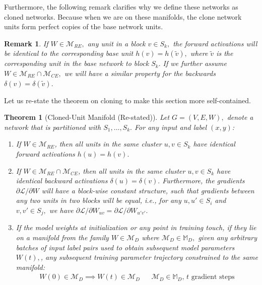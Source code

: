\documentclass{article}
\newcommand{\Loss}{\mathcal{L}}
\newcommand{\ManifoldD}{\mathcal{M}_{D}}
\newcommand{\ManifoldRE}{\mathcal{M}_{RE}}
\newcommand{\ManifoldCE}{\mathcal{M}_{CE}}
\newtheorem{theorem}{Theorem}[section]
\newtheorem{remark}{Remark}[section]
\numberwithin{figure}{section}
\begin{document}
Furthermore, the following remark clarifies why we define these networks as cloned networks. Because when we are on these manifolds, the clone network units form perfect copies of the base network units. 
\begin{remark}
    If $W \in \ManifoldRE,$ any unit in a block $v \in S_k,$ the forward activations will be identical to the corresponding base unit $h(v) = h(\tilde{v}),$ where $\tilde{v}$ is the corresponding unit in the base network to block $S_k.$ If we further assume  $W \in \ManifoldRE\cap \ManifoldCE,$ we will have a similar property for the backwards $\delta (v) = \delta (\tilde{v}).$
\end{remark}
Let us re-state the theorem on cloning to make this section more self-contained. 
\begin{theorem}[Cloned-Unit Manifold (Re-stated)]
\label{prop:cloned_manifold_restated}
Let $G=(V,E,W),$ denote a network that is partitioned with $S_1,\dots, S_k. $ 
For any input and label $(x,y)$:
    \begin{enumerate}
        \item If $W \in \ManifoldRE$, then all units in the same cluster $u,v \in S_k$  have identical forward activations $h(u) = h(v).$
        \item If $W \in \ManifoldRE \cap \ManifoldCE$, then all units in the same cluster $u,v \in S_k$  have identical backward activations $\delta(u) = \delta(v).$ Furthermore, the gradients $\partial \Loss/\partial W$ will have a block-wise constant structure, such that gradients between any two units in two blocks will be equal, i.e., for any $u,u'\in S_i$ and $v,v'\in S_j,$ we have $\partial \Loss/\partial W_{uv} = \partial \Loss/\partial W_{u'v'}.$  
        \item If the model weights at initialization or any point in training touch, if they lie on a manifold from the family  $W\in \ManifoldD$ where $\ManifoldD \in \mathbb{M}_D,$ given any arbitrary batches of input label pairs used to obtain subsequent model parameters $W(t), $, any subsequent training parameter trajectory constrained to the same manifold:
    \begin{align*}
    W(0)\in \ManifoldD \implies    W(t) \in \ManifoldD && \text{$\ManifoldD\in \mathbb{M}_D$, $t$ gradient steps}
    \end{align*}
\end{enumerate}
\end{theorem}
\end{document}

